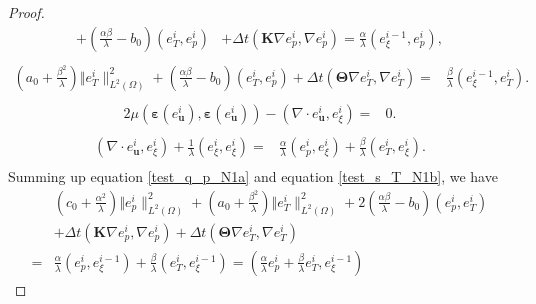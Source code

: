 \documentclass{article}
\numberwithin{equation}{section}
\begin{document}
\begin{proof}
\begin{equation}
\begin{aligned}
                + (\frac{\alpha\beta}{\lambda}-b_0)( e_{T}^i, e_{p}^i)
                 &+ \Delta t(\bm K\nabla e_{p}^i,\nabla e_{p}^i)    
                =  \frac\alpha\lambda( e_{\xi}^{i-1},e_{p}^i  )     ,\\ 
\end{aligned}
\end{equation}
\begin{equation}\label{test_s_T_N1b}  
\begin{aligned} (a_0    +\frac{\beta^2}{\lambda})\Vert e_{T}^i\|_{L^2(\Omega)}^2
                + (\frac{\alpha\beta}{\lambda}-b_0)( e_{T}^i, e_{p}^i)  
                 + \Delta t(\bm\Theta\nabla e_{T}^i,\nabla e_{T}^i )  
                =&   \frac\beta\lambda( e_{\xi}^{i-1}, e_{T}^i)     .\\ 
\end{aligned}
\end{equation}
\begin{equation}\label{test_v_u_N1}
\begin{aligned} 
2\mu(\bm\varepsilon(e_{\bm u}^i),\bm\varepsilon(e_{\bm u}^{i})) - (\nabla\cdot e_{\bm u}^i,e_{\xi}^i)=&0       .  \\
\end{aligned}
\end{equation} 
\begin{equation}\label{test_phi_xi}
\begin{aligned} 
   (\nabla\cdot e_{\bm u}^{i},e_{\xi}^i)+\frac{1}{\lambda}(e_{\xi}^i,e_{\xi}^i)
   =&\frac{\alpha}{\lambda}(e_{p}^i,e_{\xi}^i)+\frac{\beta}{\lambda}(e_{T}^i,e_{\xi}^i).\\ 
\end{aligned}
\end{equation}  
Summing up equation \eqref{test_q_p_N1a} and equation \eqref{test_s_T_N1b}, we have 
\begin{equation}\label{eq: sum_N1}  
\begin{aligned}   
     & (c_0 + \frac{\alpha^2}{\lambda})\Vert e_{p}^i\|_{L^2(\Omega)}^2 
     + (a_0 + \frac{\beta^2}{\lambda})\Vert e_{T}^i\|_{L^2(\Omega)}^2 
     + 2(\frac{\alpha\beta}{\lambda}-b_0)(e_{p}^i,e_{T}^i)\\
     &+ \Delta t(\bm K\nabla e_{p}^i,\nabla  e_{p}^i) 
     + \Delta t(\bm\Theta\nabla e_{T}^i,\nabla e_{T}^i )  
          \\
   =&      \frac\alpha\lambda(e_{p}^i,e_{\xi}^{i-1})
       +   \frac\beta\lambda(e_{T}^i,e_{\xi}^{i-1}) 
       =    ( \frac\alpha\lambda e_{p}^i+\frac\beta\lambda e_{T}^i,e_{\xi}^{i-1})

\end{aligned}
\end{equation}
\end{proof}
\end{document}
